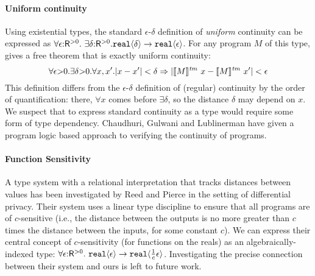 \paragraph{Uniform continuity}
Using %
existential types, %
the standard $\epsilon$-$\delta$ definition of
\emph{uniform} continuity can be expressed as %
$  \forall \epsilon \mathord: \mathsf{R}^{>0}.\ \exists \delta\mathord: \mathsf{R}^{>0}.\\ \textup{\texttt{real}}\langle \delta \rangle \to \textup{\texttt{real}}\langle \epsilon \rangle$.
For any program $M$ of this type, %
 gives a free theorem that is exactly 
uniform continuity:
\begin{displaymath}
  \forall \epsilon \mathord> 0. \exists \delta \mathord> 0. \forall x,x'. |x - x'| < \delta \Rightarrow |\llbracket M \rrbracket^{\mathit{tm}}\ x - \llbracket M \rrbracket^{\mathit{tm}}\ x'| < \epsilon
\end{displaymath}
This definition differs from the $\epsilon$-$\delta$ definition of
(regular) continuity by the order of quantification:
there, $\forall x$ comes before $\exists \delta$, so the distance
$\delta$ may depend on %
$x$. We suspect that to express standard continuity as a type would
require some form of type dependency. Chaudhuri, Gulwani and
Lublinerman \cite{chaudhuri10continuity} have given a program logic
based approach to verifying the continuity of programs.

\paragraph{Function Sensitivity}
A type system with a relational interpretation that tracks distances
between values has %
been investigated by Reed and Pierce \cite{reed10distance} in the
setting of differential privacy. Their system uses a linear type
discipline to ensure that all programs are of $c$-sensitive (i.e., the
distance between the outputs is no more greater than $c$ times the
distance between the inputs, for some constant $c$). We can express
their central concept of $c$-sensitivity (for functions on the reals)
as an algebraically-indexed type: $\forall
\epsilon\mathord:\mathsf{R}^{>0}.\ \textup{\texttt{real}}\langle \epsilon \rangle \to
\textup{\texttt{real}}\langle \frac{1}{c}\epsilon \rangle$. Investigating the precise
connection between their system and ours is left to future work.


